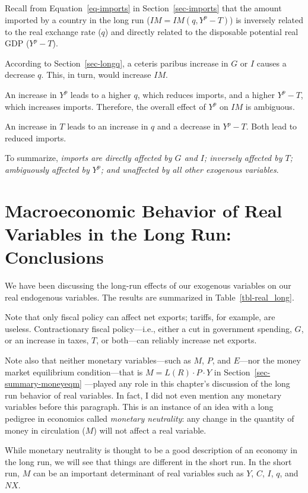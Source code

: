 \documentclass[
  letterpaper,
]{book}
\theoremstyle{plain}
\theoremstyle{remark}
\begin{document}
Recall from Equation~\ref{eq-imports} in Section~\ref{sec-imports} that
the amount imported by a country in the long run (\(IM=IM(q,Y^p-T)\)) is
inversely related to the real exchange rate (\(q\)) and directly related
to the disposable potential real GDP (\(Y^p-T\)).

According to Section~\ref{sec-longq}, a ceteris paribus increase in
\(G\) or \(I\) causes a decrease \(q\). This, in turn, would increase
\(IM\).

An increase in \(Y^p\) leads to a higher \(q\), which reduces imports,
and a higher \(Y^p-T\), which increases imports. Therefore, the overall
effect of \(Y^p\) on \(IM\) is ambiguous.

An increase in \(T\) leads to an increase in \(q\) and a decrease in
\(Y^p-T\). Both lead to reduced imports.

To summarize, \emph{imports are directly affected by \(G\) and \(I\);
inversely affected by \(T\); ambiguously affected by \(Y^p\); and
unaffected by all other exogenous variables}.

\section{Macroeconomic Behavior of Real Variables in the Long Run:
Conclusions}\label{sec-longrealconclusions}

We have been discussing the long-run effects of our exogenous variables
on our real endogenous variables. The results are summarized in
Table~\ref{tbl-real_long}.

Note that only fiscal policy can affect net exports; tariffs, for
example, are useless. Contractionary fiscal policy---i.e., either a cut
in government spending, \(G\), or an increase in taxes, \(T\), or
both---can reliably increase net
exports.

Note also that neither monetary variables---such as \(M\), \(P\), and
\(E\)---nor the money market equilibrium condition---that is
\(M=L(R)\cdot P\cdot Y\) in Section~\ref{sec-summary-moneyeqm} ---played
any role in this chapter's discussion of the long run behavior of real
variables. In fact, I did not even mention any monetary variables before
this paragraph. This is an instance of an idea with a long pedigree in
economics called \emph{monetary neutrality}: any change in the quantity
of money in circulation (\(M\)) will not affect a real variable.

While monetary neutrality is thought to be a good description of an
economy in the long run, we will see that things are different in the
short run. In the short run, \(M\) can be an important determinant of
real variables such as \(Y\), \(C\), \(I\), \(q\), and \(NX\).
\end{document}
